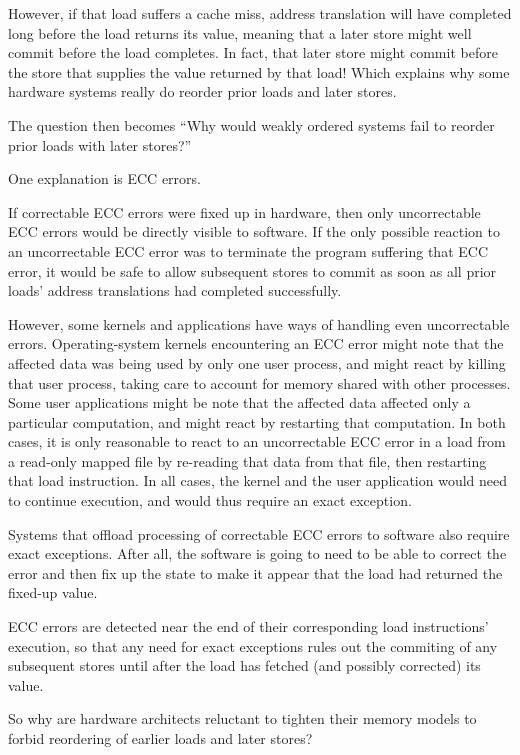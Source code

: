 \documentclass[10]{article}
\begin{document}
However, if that load suffers a cache miss, address translation will have
completed long before the load returns its value, meaning that a later
store might well commit before the load completes.
In fact, that later store might commit before the store that supplies the
value returned by that load!
Which explains why some hardware systems really do reorder prior loads
and later stores.

The question then becomes ``Why would weakly ordered systems fail to
reorder prior loads with later stores?''

One explanation is ECC errors.

If correctable ECC errors were fixed up in hardware, then only uncorrectable
ECC errors would be directly visible to software.
If the only possible reaction to an uncorrectable ECC error was to
terminate the program suffering that ECC error, it would be safe to
allow subsequent stores to commit as soon as all prior loads' address
translations had completed successfully.

However, some kernels and applications have ways of handling even
uncorrectable errors.
Operating-system kernels encountering an ECC error might note that the
affected data was being used by only one user process, and might react by
killing that user process, taking care to account for memory shared with
other processes.
Some user applications might be note that the affected data affected only
a particular computation, and might react by restarting that computation.
In both cases, it is only reasonable to react to an uncorrectable ECC
error in a load from a read-only mapped file by re-reading that data
from that file, then restarting that load instruction.
In all cases, the kernel and the user application would need to continue
execution, and would thus require an exact exception.

Systems that offload processing of correctable ECC errors to software
also require exact exceptions.
After all, the software is going to need to be able to correct the error
and then fix up the state to make it appear that the load had returned
the fixed-up value.

ECC errors are detected near the end of their corresponding load
instructions' execution, so that any need for exact exceptions rules out
the commiting of any subsequent stores until after the load has fetched
(and possibly corrected) its value.

So why are hardware architects reluctant to tighten their memory models
to forbid reordering of earlier loads and later stores?
\end{document}
